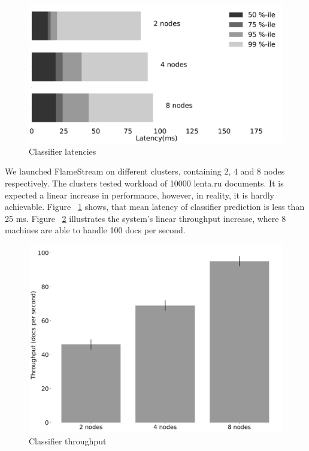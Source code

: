 \label {fs-short-experiments}

\begin{figure}[htbp]
  \centering
  \includegraphics[scale=0.1]{pics/classifier_latencies}
  \caption{Classifier latencies}
  \label {latencies}
\end{figure}

We launched FlameStream on different clusters, containing 2, 4 and 8 nodes respectively. The clusters tested workload of 10000 lenta.ru documents. It is expected a linear increase in performance, however, in reality, it is hardly achievable. Figure ~\ref{latencies} shows, that mean latency of classifier prediction is less than 25 ms. Figure ~\ref{throughput} illustrates the system's linear throughput increase, where 8 machines are able to handle 100 docs per second.

\begin{figure}[htbp]
  \centering
  \includegraphics[scale=0.2]{pics/classifier_throughput}
  \caption{Classifier throughput}
  \label {throughput}
\end{figure}